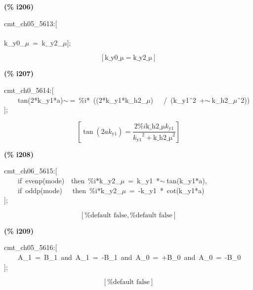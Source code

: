 \documentclass[fleqn]{article}
\begin{document}
\noindent
\begin{minipage}[t]{4.000000em}\color{red}\bfseries
(\% i206)	
\end{minipage}
\begin{minipage}[t]{\textwidth}\color{blue}
cmt\_ch05\_5613:[\\
\\
k\_y0\_\ensuremath{\mu}\ =\ k\_y2\_\ensuremath{\mu}];
\end{minipage}
\[\displaystyle \tag{\% o206} 
\left[ \ensuremath{\mathrm{k\_ y0\_ \mu }}=\ensuremath{\mathrm{k\_ y2\_ \mu }}\right] \mbox{}
\]


\noindent
\begin{minipage}[t]{4.000000em}\color{red}\bfseries
(\% i207)	
\end{minipage}
\begin{minipage}[t]{\textwidth}\color{blue}
cmt\_ch0\_5614:[\\
\ \ \ \ tan(2*k\_y1*a)\ensuremath{\sim\ }=\ \%i*\ ((2*k\_y1*k\_h2\_\ensuremath{\mu})\ \ \ /\ (k\_y1\^\ 2\ +\ensuremath{\sim\ }k\_h2\_\ensuremath{\mu}\^\ 2))\\
];
\end{minipage}
\[\displaystyle \tag{\% o207} 
\left[ \tan{\left( 2 a {k_{\ensuremath{\mathrm{y1}}}}\right) }=\frac{2 \% i \ensuremath{\mathrm{k\_ h2\_ \mu }} {k_{\ensuremath{\mathrm{y1}}}}}{{{{k_{\ensuremath{\mathrm{y1}}}}}^{2}}+{{\ensuremath{\mathrm{k\_ h2\_ \mu }}}^{2}}}\right] \mbox{}
\]


\noindent
\begin{minipage}[t]{4.000000em}\color{red}\bfseries
(\% i208)	
\end{minipage}
\begin{minipage}[t]{\textwidth}\color{blue}
cmt\_ch06\_5615:[\\
\ \ \ \ if\ evenp(mode)\ \ then\ \%i*k\_y2\_\ensuremath{\mu}\ =\ k\_y1\ *\ensuremath{\sim\ }tan(k\_y1*a),\\
\ \ \ \ if\ oddp(mode)\ \ \ then\ \%i*k\_y2\_\ensuremath{\mu}\ =\ -k\_y1\ *\ cot(k\_y1*a)\\
];
\end{minipage}
\[\displaystyle \tag{\% o208} 
\left[ \mbox{%
false}\operatorname{,}\mbox{%
false}\right] \mbox{}
\]


\noindent
\begin{minipage}[t]{4.000000em}\color{red}\bfseries
(\% i209)	
\end{minipage}
\begin{minipage}[t]{\textwidth}\color{blue}
cmt\_ch05\_5616:[\\
\ \ \ \ A\_1\ =\ B\_1\ and\ A\_1\ =\ -B\_1\ and\ A\_0\ =\ +B\_0\ and\ A\_0\ =\ -B\_0\\
];
\end{minipage}
\[\displaystyle \tag{\% o209} 
\left[ \mbox{%
false}\right] \mbox{}
\]
\end{document}
